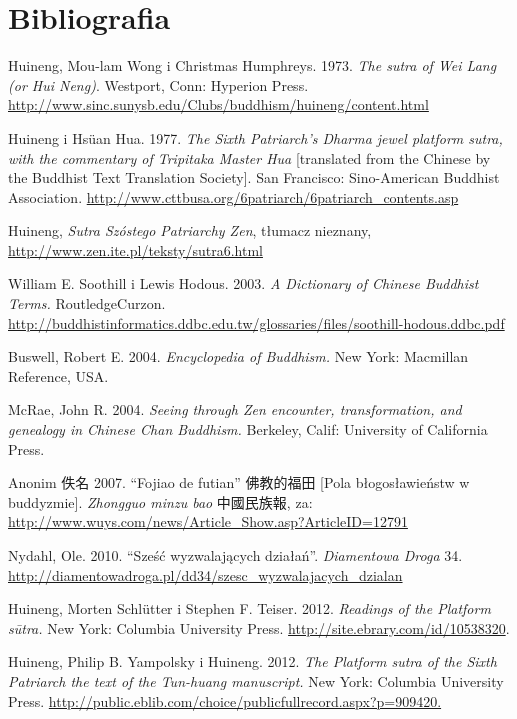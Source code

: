 \vspace*{-15pt}
\section*{Bibliografia}

Huineng, Mou-lam Wong i Christmas Humphreys. 1973. \textit{The sutra of Wei Lang (or Hui Neng)}. Westport, Conn: Hyperion Press. \url{http://www.sinc.sunysb.edu/Clubs/buddhism/huineng/content.html}

Huineng i Hsüan Hua. 1977. \textit{The Sixth Patriarch's Dharma jewel platform sutra, with the commentary of Tripitaka Master Hua} [translated from the Chinese by the Buddhist Text Translation Society]. San Francisco: Sino-American Buddhist Association. \url{http://www.cttbusa.org/6patriarch/6patriarch_contents.asp}

Huineng, \textit{Sutra Szóstego Patriarchy Zen}, tłumacz nieznany, \url{http://www.zen.ite.pl/teksty/sutra6.html}

William E. Soothill i Lewis Hodous. 2003. \textit{A Dictionary of Chinese Buddhist Terms.} RoutledgeCurzon. \url{http://buddhistinformatics.ddbc.edu.tw/glossaries/files/soothill-hodous.ddbc.pdf}

Buswell, Robert E. 2004. \textit{Encyclopedia of Buddhism.} New York: Macmillan Reference, USA.

McRae, John R. 2004. \textit{Seeing through Zen encounter, transformation, and genealogy in Chinese Chan Buddhism.} Berkeley, Calif: University of California Press.

Anonim 佚名 2007. ``Fojiao de futian'' 佛教的福田 [Pola błogosławieństw w buddyzmie]. \textit{Zhongguo minzu bao} 中國民族報, za: \url{http://www.wuys.com/news/Article_Show.asp?ArticleID=12791}

Nydahl, Ole. 2010. ``Sześć wyzwalających działań''. \textit{Diamentowa Droga} 34. \url{http://diamentowadroga.pl/dd34/szesc_wyzwalajacych_dzialan}

Huineng, Morten Schlütter i Stephen F. Teiser. 2012. \textit{Readings of the Platform sūtra.} New York: Columbia University Press. \url{http://site.ebrary.com/id/10538320}.

Huineng, Philip B. Yampolsky i Huineng. 2012. \textit{The Platform sutra of the Sixth Patriarch the text of the Tun-huang manuscript.} New York: Columbia University Press. \url{http://public.eblib.com/choice/publicfullrecord.aspx?p=909420.}
